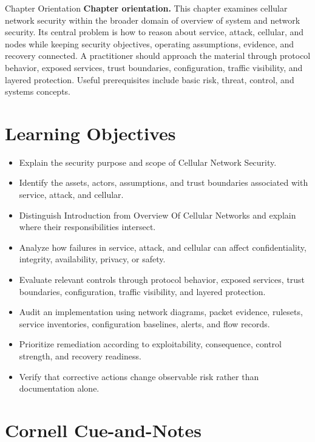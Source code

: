 \documentclass[11pt,letterpaper]{article}
\title{\CornellDocumentTitle}
\author{}
\date{}
\begin{document}
\maketitle
\begin{CornellOverviewBox}{Chapter Orientation}
\textbf{Chapter orientation.} This chapter examines cellular network security within the broader domain of overview of system and network security. Its central problem is how to reason about service, attack, cellular, and nodes while keeping security objectives, operating assumptions, evidence, and recovery connected. A practitioner should approach the material through protocol behavior, exposed services, trust boundaries, configuration, traffic visibility, and layered protection. Useful prerequisites include basic risk, threat, control, and systems concepts.
\end{CornellOverviewBox}
\section*{Learning Objectives}
\begin{itemize}
\item Explain the security purpose and scope of Cellular Network Security.
\item Identify the assets, actors, assumptions, and trust boundaries associated with service, attack, and cellular.
\item Distinguish Introduction from Overview Of Cellular Networks and explain where their responsibilities intersect.
\item Analyze how failures in service, attack, and cellular can affect confidentiality, integrity, availability, privacy, or safety.
\item Evaluate relevant controls through protocol behavior, exposed services, trust boundaries, configuration, traffic visibility, and layered protection.
\item Audit an implementation using network diagrams, packet evidence, rulesets, service inventories, configuration baselines, alerts, and flow records.
\item Prioritize remediation according to exploitability, consequence, control strength, and recovery readiness.
\item Verify that corrective actions change observable risk rather than documentation alone.
\end{itemize}
\section*{Cornell Cue-and-Notes}
\end{document}
